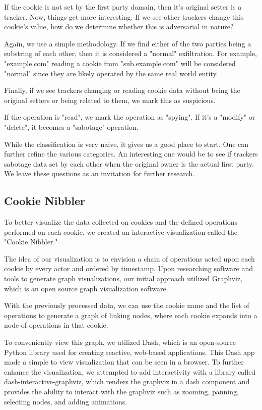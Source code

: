 \documentclass[sigplan,screen]{acmart}
\begin{document}
If the cookie is not set by the first party domain, then it's original setter is a tracker. Now, things get more interesting. If we see other trackers change this cookie's value, how do we determine whether this is adversarial in nature?

Again, we use a simple methodology. If we find either of the two parties being a substring of each other, then it is considered a "normal" exfiltration. For example, "example.com" reading a cookie from "sub.example.com" will be considered "normal" since they are likely operated by the same real world entity.

Finally, if we see trackers changing or reading cookie data without being the original setters or being related to them, we  mark this as suspicious.

If the operation is "read", we mark the operation as "spying". If it's a "modify" or "delete", it becomes a "sabotage" operation.

While the classification is very naive, it gives us a good place to start. One can further refine the various categories. An interesting one would be to see if trackers sabotage data set by each other when the original owner is the actual first party. We leave these questions as an invitation for further research.


\subsection{Cookie Nibbler}

To better visualize the data collected on cookies and the defined operations performed on each cookie, we created an interactive visualization called the "Cookie Nibbler."

The idea of our visualization is to envision a chain of operations acted upon each cookie by every actor and ordered by timestamp. Upon researching software and tools to generate graph visualizations, our initial approach utilized Graphviz\cite{graphviz}, which is an open source graph visualization software. 

With the previously processed data, we can use the cookie name and the list of operations to generate a graph of linking nodes, where each cookie expands into a node of operations in that cookie.

To conveniently view this graph, we utilized Dash\cite{Dash}, which is an open-source Python library used for creating reactive, web-based applications. This Dash app made a simple to view visualization that can be seen in a browser. To further enhance the visualization, we attempted to add interactivity with a library called dash-interactive-graphviz\cite{dash-int}, which renders the graphviz in a dash component and provides the ability to interact with the graphviz such as zooming, panning, selecting nodes, and adding animations.
\end{document}
